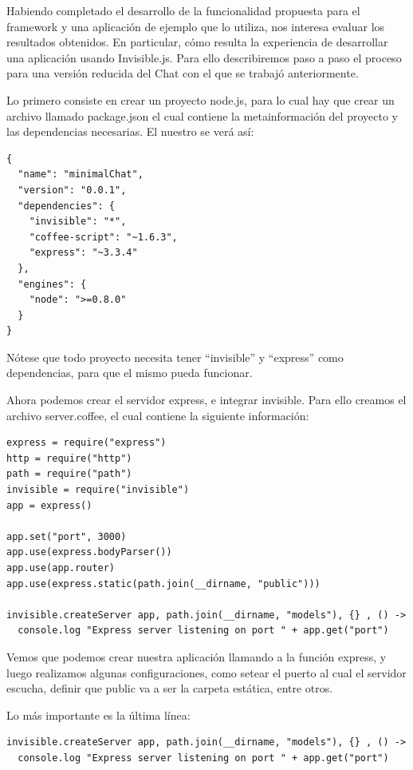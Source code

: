 \documentclass[doc,helv,longtable]{article}
\begin{document}
Habiendo completado el desarrollo de la funcionalidad propuesta para el framework y una aplicación de ejemplo que lo utiliza, nos interesa evaluar los resultados obtenidos. En particular, cómo resulta la experiencia de desarrollar una aplicación usando Invisible.js. Para ello describiremos paso a paso el proceso para una versión reducida del Chat con el que se trabajó anteriormente.

Lo primero consiste en crear un proyecto node.js, para lo cual hay que crear un archivo llamado package.json el cual contiene la metainformación del proyecto y las dependencias necesarias. El nuestro se verá así:

\begin{lstlisting}
{
  "name": "minimalChat",
  "version": "0.0.1",
  "dependencies": {
    "invisible": "*",
    "coffee-script": "~1.6.3",
    "express": "~3.3.4"
  },
  "engines": {
    "node": ">=0.8.0"
  }
}
\end{lstlisting}

Nótese que todo proyecto necesita tener “invisible” y “express” como dependencias, para que el mismo pueda funcionar.

Ahora podemos crear el servidor express, e integrar invisible. Para ello creamos el archivo server.coffee, el cual contiene la siguiente información:

\begin{lstlisting}
express = require("express")
http = require("http")
path = require("path")
invisible = require("invisible")
app = express()

app.set("port", 3000)
app.use(express.bodyParser())
app.use(app.router)
app.use(express.static(path.join(__dirname, "public")))

invisible.createServer app, path.join(__dirname, "models"), {} , () ->
  console.log "Express server listening on port " + app.get("port")
\end{lstlisting}

Vemos que podemos crear nuestra aplicación llamando a la función express, y luego realizamos algunas configuraciones, como setear el puerto al cual el servidor escucha, definir que public va a ser la carpeta estática, entre otros.

Lo más importante es la última línea: 

\begin{lstlisting}
invisible.createServer app, path.join(__dirname, "models"), {} , () ->
  console.log "Express server listening on port " + app.get("port")
\end{lstlisting}
\end{document}
